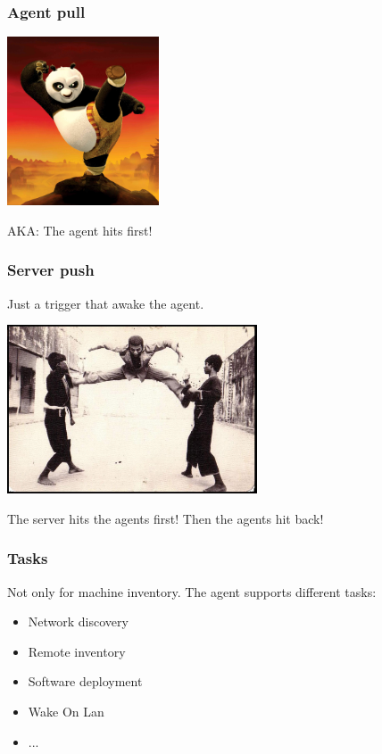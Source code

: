 \begin{frame}
    \frametitle{Agent pull}


    \includegraphics[height=5.0cm]{pics/kung-fu-panda.jpg}


    AKA: The agent hits first!

\end{frame}

\begin{frame}
    \frametitle{Server push}

    Just a trigger that awake the agent.


    \includegraphics[height=5.0cm]{pics/double-kick.jpg}

    The server hits the agents first! Then the agents hit back!

\end{frame}

\begin{frame}
    \frametitle{Tasks}
    Not only for machine inventory. The agent supports different tasks:

    \pause
    \begin{itemize}

        \item Network discovery
        \item Remote inventory
        \item Software deployment
        \item Wake On Lan
        \item ...
    \end{itemize}
\end{frame}

